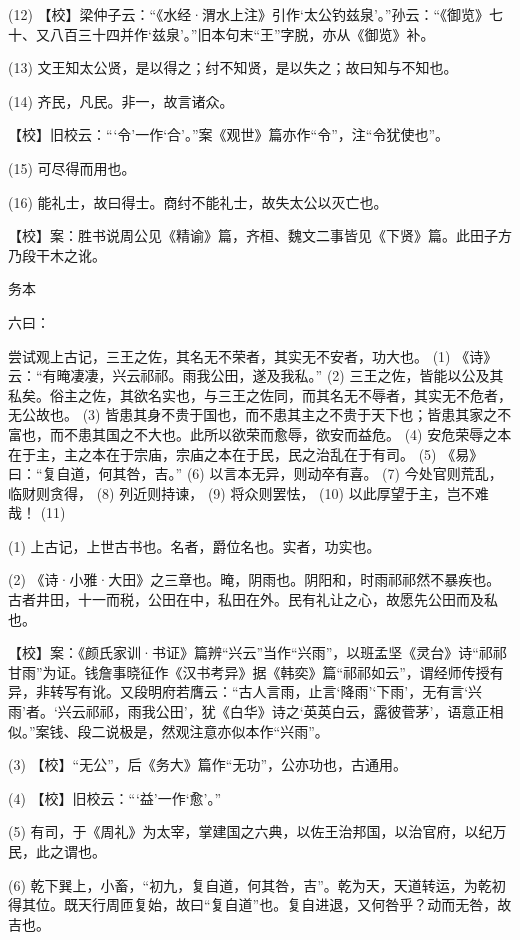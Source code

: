 \documentclass[12pt,UTF8]{ctexbook}
\begin{document}
(12) 【校】梁仲子云：“《水经·渭水上注》引作‘太公钓兹泉’。”孙云：“《御览》七十、又八百三十四并作‘兹泉’。”旧本句末“王”字脱，亦从《御览》补。

(13) 文王知太公贤，是以得之；纣不知贤，是以失之；故曰知与不知也。

(14) 齐民，凡民。非一，故言诸众。

【校】旧校云：“‘令’一作‘合’。”案《观世》篇亦作“令”，注“令犹使也”。

(15) 可尽得而用也。

(16) 能礼士，故曰得士。商纣不能礼士，故失太公以灭亡也。

【校】案：胜书说周公见《精谕》篇，齐桓、魏文二事皆见《下贤》篇。此田子方乃段干木之讹。





务本


六曰：

尝试观上古记，三王之佐，其名无不荣者，其实无不安者，功大也。 (1) 《诗》云：“有晻凄凄，兴云祁祁。雨我公田，遂及我私。” (2) 三王之佐，皆能以公及其私矣。俗主之佐，其欲名实也，与三王之佐同，而其名无不辱者，其实无不危者，无公故也。 (3) 皆患其身不贵于国也，而不患其主之不贵于天下也；皆患其家之不富也，而不患其国之不大也。此所以欲荣而愈辱，欲安而益危。 (4) 安危荣辱之本在于主，主之本在于宗庙，宗庙之本在于民，民之治乱在于有司。 (5) 《易》曰：“复自道，何其咎，吉。” (6) 以言本无异，则动卒有喜。 (7) 今处官则荒乱，临财则贪得， (8) 列近则持谏， (9) 将众则罢怯， (10) 以此厚望于主，岂不难哉！ (11)

(1) 上古记，上世古书也。名者，爵位名也。实者，功实也。

(2) 《诗·小雅·大田》之三章也。晻，阴雨也。阴阳和，时雨祁祁然不暴疾也。古者井田，十一而税，公田在中，私田在外。民有礼让之心，故愿先公田而及私也。

【校】案：《颜氏家训·书证》篇辨“兴云”当作“兴雨”，以班孟坚《灵台》诗“祁祁甘雨”为证。钱詹事晓征作《汉书考异》据《韩奕》篇“祁祁如云”，谓经师传授有异，非转写有讹。又段明府若膺云：“古人言雨，止言‘降雨’‘下雨’，无有言‘兴雨’者。‘兴云祁祁，雨我公田’，犹《白华》诗之‘英英白云，露彼菅茅’，语意正相似。”案钱、段二说极是，然观注意亦似本作“兴雨”。

(3) 【校】“无公”，后《务大》篇作“无功”，公亦功也，古通用。

(4) 【校】旧校云：“‘益’一作‘愈’。”

(5) 有司，于《周礼》为太宰，掌建国之六典，以佐王治邦国，以治官府，以纪万民，此之谓也。

(6) 乾下巽上，小畜，“初九，复自道，何其咎，吉”。乾为天，天道转运，为乾初得其位。既天行周匝复始，故曰“复自道”也。复自进退，又何咎乎？动而无咎，故吉也。
\end{document}
